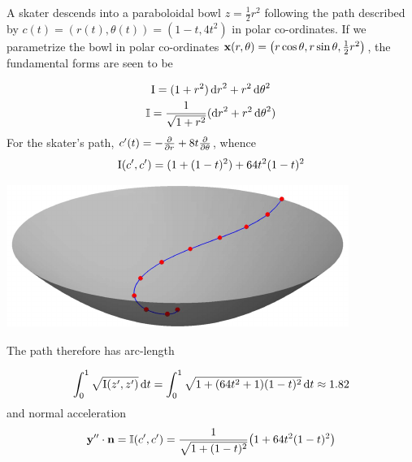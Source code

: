 \begin{example}{}{}
	A skater descends into a paraboloidal bowl $z=\frac 12r^2$ following the path described by $c(t)=(r(t),\theta(t))=(1-t,4t^2)$ in polar co-ordinates. If we parametrize the bowl in polar co-ordinates ${\mathbf{x}}(r,\theta)=\bigl(r\cos\theta,r\sin\theta,\frac 12r^2\bigr)$, the fundamental forms are seen to be
	\par
	\begin{minipage}[t]{0.5\linewidth}\vspace{-10pt}
		\begin{gather*}
			\mathrm{I}=(1+r^2)\,{\mathrm{d} r}^2+r^2\,{\mathrm{d}\theta}^2\\
			\mathbb{I}=\frac 1{\sqrt{1+r^2}}({\mathrm{d} r}^2+r^2\,{\mathrm{d}\theta}^2)
		\end{gather*}
		For the skater's path, $c'(t)=-\frac{\partial }{\partial r}+8t\frac{\partial }{\partial \theta}$, whence
		\[
			\mathrm{I}(c',c')=(1+(1-t)^2)+64t^2(1-t)^2
		\]
	\end{minipage}
	\hfill
	\begin{minipage}[t]{0.49\linewidth}\vspace{0pt}
		\flushright\includegraphics{fund-skater}
	\end{minipage}
	\bigbreak
	The path therefore has arc-length
	\par
	\begin{minipage}[t]{0.6\linewidth}\vspace{-8pt}
		\[
			\int_0^1\sqrt{\mathrm{I}(z',z')}\,{\mathrm{d} t} =\int_0^1\sqrt{1+(64t^2+1)(1-t)^2}\,{\mathrm{d} t} \approx 1.82
		\]
		and normal acceleration
		\[
			{\mathbf{y}}''\cdot{\mathbf{n}} =\mathbb{I}(c',c') =\frac 1{\sqrt{1+(1-t)^2}}\bigl(1+64t^2(1-t)^2\bigr)
		\]
	\end{minipage}
	\hfill
	\begin{minipage}[t]{0.39\linewidth}\vspace{-2pt}

\end{minipage}
\end{example}
